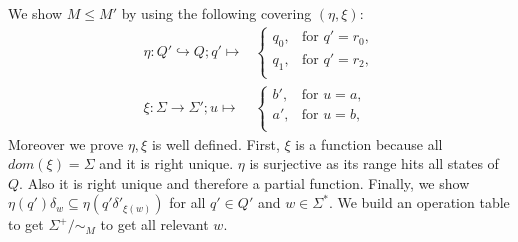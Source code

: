 \documentclass[a4paper,12pt,numbers=noenddot]{scrreport}
\begin{document}

\chapter{}
\section{}
\section{}
\section{}
\section{}
We show $M \leq M'$ by using the following covering $(\eta, \xi)$:
\begin{align*}
    \eta: Q' \hookrightarrow Q; q' \mapsto &
        \begin{cases}
            q_0,      & \text{for } q' = r_0, \\
            q_1,      & \text{for } q' = r_2, \\
        \end{cases} \\
    \xi: \Sigma \rightarrow \Sigma'; u \mapsto &
        \begin{cases}
            b',      & \text{for } u = a, \\
            a',      & \text{for } u = b, \\
        \end{cases}
\end{align*}
Moreover we prove $\eta, \xi$ is well defined.
First, $\xi$ is a function because all $dom(\xi) = \Sigma$ and it is right unique.
$\eta$ is surjective as its range hits all states of $Q$.
Also it is right unique and therefore a partial function.
Finally, we show $\eta(q')\delta_w \subseteq \eta(q'\delta'_{\xi(w)})$ for all $q' \in Q'$ and $w \in \Sigma^*$.
We build an operation table to get $\Sigma^+ / \sim_M$ to get all relevant $w$.
\end{document}
